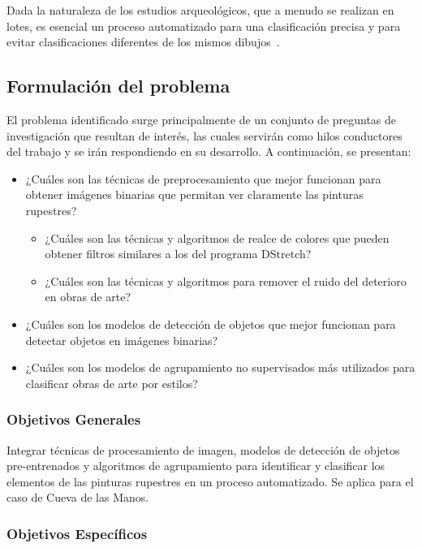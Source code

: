 Dada la naturaleza de los estudios arqueológicos, que a menudo se realizan en lotes, es esencial un proceso automatizado para una clasificación precisa y para evitar clasificaciones diferentes de los mismos dibujos~\cite{aschero1998}.

\subsection{Formulación del problema}

El problema identificado surge principalmente de un conjunto de preguntas de investigación que resultan de interés, las cuales servirán como hilos conductores del trabajo y se irán respondiendo en su desarrollo.
A continuación, se presentan:

\begin{itemize}
    \item ¿Cuáles son las técnicas de preprocesamiento que mejor funcionan para obtener imágenes binarias que permitan ver claramente las pinturas rupestres?
    \begin{itemize}
        \item ¿Cuáles son las técnicas y algoritmos de realce de colores que pueden obtener filtros similares a los del programa DStretch?
        \item ¿Cuáles son las técnicas y algoritmos para remover el ruido del deterioro en obras de arte?
    \end{itemize}
    \item ¿Cuáles son los modelos de detección de objetos que mejor funcionan para detectar objetos en imágenes binarias?
    \item ¿Cuáles son los modelos de agrupamiento no supervisados más utilizados para clasificar obras de arte por estilos?
\end{itemize}

\subsubsection{Objetivos Generales}

Integrar técnicas de procesamiento de imagen, modelos de detección de objetos pre-entrenados y algoritmos de agrupamiento para identificar y clasificar los elementos de las pinturas rupestres en un proceso automatizado.
Se aplica para el caso de Cueva de las Manos.

\subsubsection{Objetivos Específicos}

